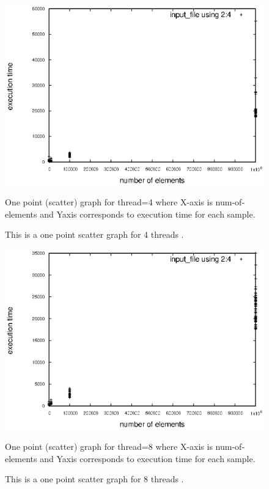 \documentclass{article}
\begin{document}
\begin{figure}
\centering
\includegraphics{graphs/4_t1.eps}
\vspace{60pt}
 \caption{This is a one point scatter graph for 4 threads .}
 \vspace{30pt}
 One point (scatter) graph for thread=4 where X-axis is num-of-elements and Yaxis
 corresponds to execution time for each sample.
 \label{fig:4_t1}
\end{figure}


\begin{figure}
\centering
\includegraphics{graphs/8_t1.eps}
\vspace{60pt}
 \caption{This is a one point scatter graph for 8 threads .}
 \vspace{30pt}
 One point (scatter) graph for thread=8 where X-axis is num-of-elements and Yaxis
 corresponds to execution time for each sample.
 \label{fig:8_t1}
\end{figure}
\end{document}
